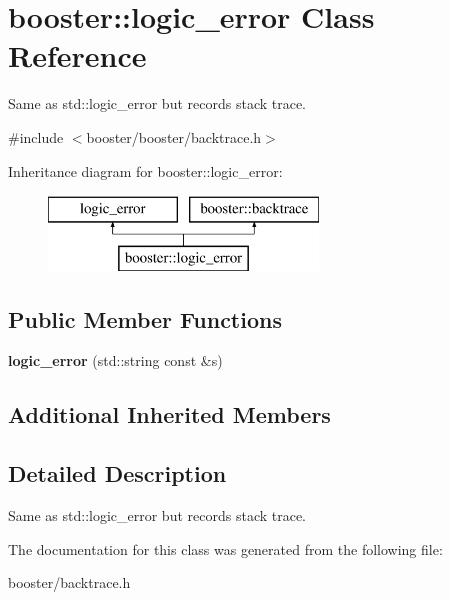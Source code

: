 \section{booster\+:\+:logic\+\_\+error Class Reference}
\label{classbooster_1_1logic__error}


Same as std\+::logic\+\_\+error but records stack trace.  




{\ttfamily \#include $<$booster/booster/backtrace.\+h$>$}

Inheritance diagram for booster\+:\+:logic\+\_\+error\+:\begin{figure}[H]
\begin{center}
\leavevmode
\includegraphics[height=2.000000cm]{classbooster_1_1logic__error}
\end{center}
\end{figure}
\subsection*{Public Member Functions}
\begin{DoxyCompactItemize}
\item 
{\bfseries logic\+\_\+error} (std\+::string const \&s)\label{classbooster_1_1logic__error_a278715b977332a5dfd2130167761518f}

\end{DoxyCompactItemize}
\subsection*{Additional Inherited Members}


\subsection{Detailed Description}
Same as std\+::logic\+\_\+error but records stack trace. 

The documentation for this class was generated from the following file\+:\begin{DoxyCompactItemize}
\item 
booster/backtrace.\+h\end{DoxyCompactItemize}
